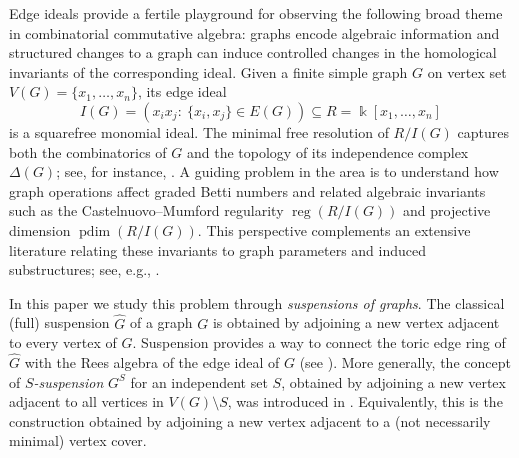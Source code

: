 \documentclass[12pt]{amsart}
\theoremstyle{plain}
\theoremstyle{definition}
\DeclareMathOperator{\reg}{reg}
\DeclareMathOperator{\pdim}{pdim}
\begin{document}
Edge ideals provide a fertile playground for observing the following broad theme in combinatorial commutative algebra:
graphs encode algebraic information and structured changes to a graph can induce controlled changes in the homological invariants of the corresponding ideal.  Given a
finite simple graph $G$ on vertex set $V(G)=\{x_1,\dots,x_n\}$, its edge ideal
\[
I(G)=(x_ix_j:\ \{x_i,x_j\}\in E(G))\subseteq R=\Bbbk[x_1,\dots,x_n]
\]
is a squarefree monomial ideal. The minimal free resolution of $R/I(G)$ captures both the combinatorics of $G$
and the topology of its independence complex $\Delta(G)$; see, for instance,
\cite{MoreyVillarreal,herzog2011monomial,Hochster77,EagonReiner98}.  A guiding problem in the area is
to understand how graph operations affect graded Betti numbers and related algebraic invariants such as the
Castelnuovo--Mumford regularity $\reg(R/I(G))$ and projective dimension $\pdim(R/I(G))$.  This
perspective complements an extensive literature relating these invariants to graph parameters and
induced substructures; see, e.g., \cite{ProjDim,ha2008monomial,IndMatch,RegMatch,CWRegDeg}.


In this paper we study this problem through \emph{suspensions of graphs}.
The classical (full) suspension $\widehat{G}$ of a graph $G$ is obtained by adjoining a new vertex adjacent to every vertex of $G$.  Suspension provides a way to connect the toric edge ring of $\widehat{G}$ with the Rees algebra of the edge ideal of $G$ (see  \cite{herzog2011monomial, Hibi_suspension_toric}).
More generally,  the concept of \emph{$S$-suspension} $G^{S}$ for an independent set $S$, obtained by adjoining a new vertex adjacent to all vertices in $V(G)\setminus S$, was introduced in \cite{IndMatch}.
Equivalently, this is the construction obtained by adjoining a new vertex adjacent to a (not necessarily minimal) vertex cover.
\end{document}
